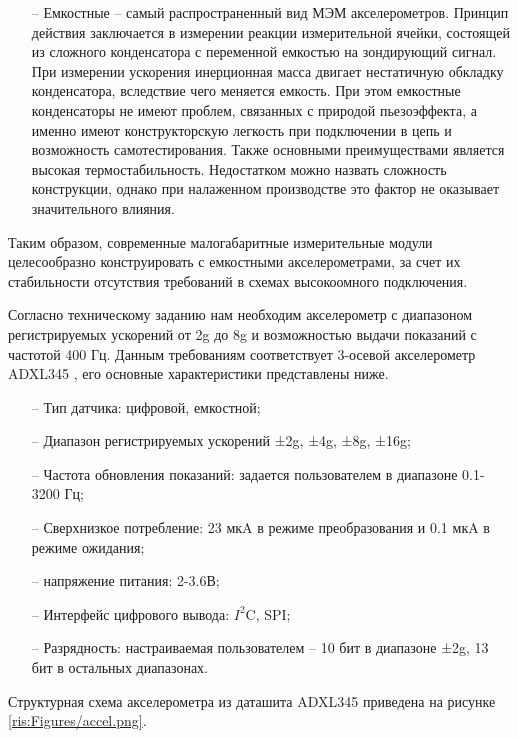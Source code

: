 \begin{sloppypar}
\begin{itemize}
	\item[--]Емкостные – самый распространенный вид МЭМ акселерометров. Принцип действия заключается в измерении реакции измерительной ячейки, состоящей из сложного конденсатора с переменной емкостью на зондирующий сигнал. При измерении ускорения инерционная масса двигает нестатичную обкладку конденсатора, вследствие чего меняется емкость. При этом емкостные конденсаторы не имеют проблем, связанных с природой пьезоэффекта, а именно имеют конструкторскую легкость при подключении в цепь и возможность самотестирования. Также основными преимуществами является высокая термостабильность. Недостатком можно назвать сложность конструкции, однако при налаженном производстве это фактор не оказывает значительного влияния.

\end{itemize}

Таким образом, современные малогабаритные измерительные модули целесообразно конструировать с емкостными акселерометрами, за счет их стабильности отсутствия требований в схемах высокоомного подключения.


Согласно техническому заданию нам необходим акселерометр с диапазоном регистрируемых ускорений от 2g до 8g и возможностью выдачи показаний с частотой 400 Гц. Данным требованиям соответствует 3-осевой акселерометр ADXL345 \cite {ADXL}, его основные характеристики представлены ниже.


\begin{onehalfspace}
\begin{itemize}
	\item[--] Тип датчика: цифровой, емкостной;
	\item[--]Диапазон регистрируемых ускорений ±2g, ±4g, ±8g, ±16g;
	\item[--]Частота обновления показаний: задается пользователем в диапазоне 0.1-3200 Гц;
	\item[--]Сверхнизкое потребление:  23 мкA в режиме преобразования и 0.1 мкA в режиме ожидания;
	\item[--] напряжение питания: 2-3.6В;
	\item[--] Интерфейс цифрового вывода: $I^2$C, SPI; 
	\item[--] Разрядность: настраиваемая пользователем -- 10 бит в диапазоне ±2g, 13 бит в остальных диапазонах.	
\end{itemize}
\end{onehalfspace}




Структурная схема акселерометра из даташита ADXL345 приведена на рисунке \ref{ris:Figures/accel.png}.


\end{sloppypar}
